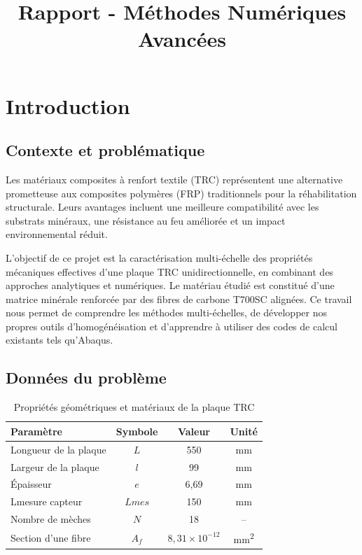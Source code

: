 \documentclass{rapportECL}
\title{Rapport - Méthodes Numériques Avancées} %
\begin{document}

\fairemarges
\fairepagedegarde
\newpage
\tabledematieres
\newpage

\section*{Introduction}
\vspace{20pt}

\subsection*{Contexte et problématique}

\noindent Les matériaux composites à renfort textile (TRC) représentent une alternative prometteuse aux composites polymères (FRP) traditionnels pour la réhabilitation structurale. Leurs avantages incluent une meilleure compatibilité avec les substrats minéraux, une résistance au feu améliorée et un impact environnemental réduit.

L'objectif de ce projet est la caractérisation multi-échelle des propriétés mécaniques effectives d'une plaque TRC unidirectionnelle, en combinant des approches analytiques et numériques. Le matériau étudié est constitué d'une matrice minérale renforcée par des fibres de carbone T700SC alignées. Ce travail nous permet de comprendre les méthodes multi-échelles, de développer nos propres outils d'homogénéisation et d'apprendre à utiliser des codes de calcul existants tels qu'Abaqus.

\vspace{20pt}

\subsection*{Données du problème}

\begin{table}[H]
\centering
\caption{Propriétés géométriques et matériaux de la plaque TRC}
\begin{tabular}{lccc}
\toprule
Paramètre & Symbole & Valeur & Unité \\
\midrule
Longueur de la plaque & $L$ & 550 & \si{\milli\meter} \\
Largeur de la plaque & $l$ & 99 & \si{\milli\meter} \\
Épaisseur & $e$ & 6,69 & \si{\milli\meter} \\
Lmesure capteur & $Lmes$ & 150 & \si{\milli\meter} \\
Nombre de mèches & $N$ & 18 & -- \\
Section d'une fibre & $A_f$ & $8,31\times10^{-12}$ & \si{\milli\meter^2} \\
\bottomrule
\end{tabular}
\end{table}
\end{document}
